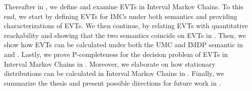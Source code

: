 Thereafter in , we define and examine EVTs in Interval Markov Chains. To this end, we start by defining EVTs for IMCs under both semantics and providing characterizations of EVTs. We then continue, by relating EVTs with quantitative reachability and showing that the two semantics coincide on EVTs in . Then, we show how EVTs can be calculated under both the UMC and IMDP semantic in  and . Lastly, we prove P-completeness for the decision problem of EVTs in Interval Markov Chains in . 
Moreover, we elaborate on how stationary distributions can be calculated in Interval Markov Chains in .
Finally, we summarize the thesis and present possible directions for future work in .





